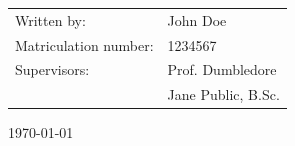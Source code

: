 \begin{titlepage}
\begin{center}
    \begin{tabular}{ll}
      \large{Written by:}           & \large{John Doe}           \\[0.2cm]
      \large{Matriculation number:} & \large{1234567}            \\[0.2cm]
      \large{Supervisors:}          & \large{Prof. Dumbledore}   \\[0.2cm]
                                    & \large{Jane Public, B.Sc.}
    \end{tabular}


    \vfill
    {\Large{\today}}
    \clearpage
    \thispagestyle{empty}
  \end{center}
\end{titlepage}
\cleardoublepage
